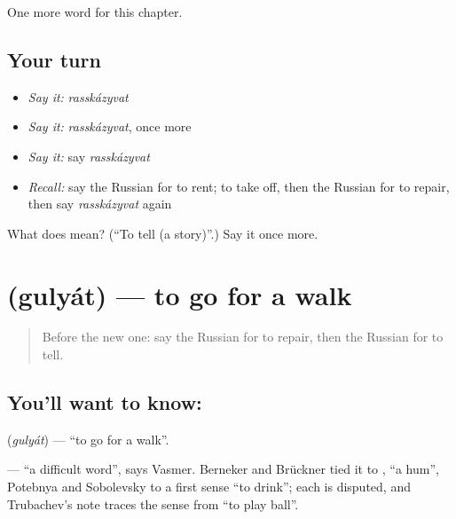 \begin{grammarlens}[title={What you've built}]
One more word for this chapter.
\end{grammarlens}

\subsection*{Your turn}
\begin{itemize}
\raggedright
  \item \emph{Say it:} \emph{rasskázyvat}
  \item \emph{Say it:} \emph{rasskázyvat}, once more
  \item \emph{Say it:} say \emph{rasskázyvat}
  \item \emph{Recall:} say the Russian for to rent; to take off, then the Russian for to repair, then say \emph{rasskázyvat} again
\end{itemize}

\begin{tcolorbox}[breakable,colback=teal!4,colframe=teal!35!black,title={Before you move on}]
What does  mean? (\textquotedblleft{}To tell (a story)\textquotedblright{}.) Say it once more.
\end{tcolorbox}
\section[\texorpdfstring{\ru{гулять} (gulyát)}{гулять (gulyát)}]{ (gulyát) — to go for a walk}

\label{lesson:RU-C134-to-go-for-a-walk}



\begin{quote}
Before the new one: say the Russian for to repair, then the Russian for to tell.
\end{quote}

\subsection*{You'll want to know: }
\textbf{} (\emph{gulyát}) — \textquotedblleft{}to go for a walk\textquotedblright{}.

\begin{cousinweb}
\textbf{} — \textquotedblleft{}a difficult word\textquotedblright{}, says Vasmer. Berneker and Brückner tied it to \emph{}, \textquotedblleft{}a hum\textquotedblright{}, Potebnya and Sobolevsky to a first sense \textquotedblleft{}to drink\textquotedblright{}; each is disputed, and Trubachev's note traces the sense from \textquotedblleft{}to play ball\textquotedblright{}.
\end{cousinweb}


